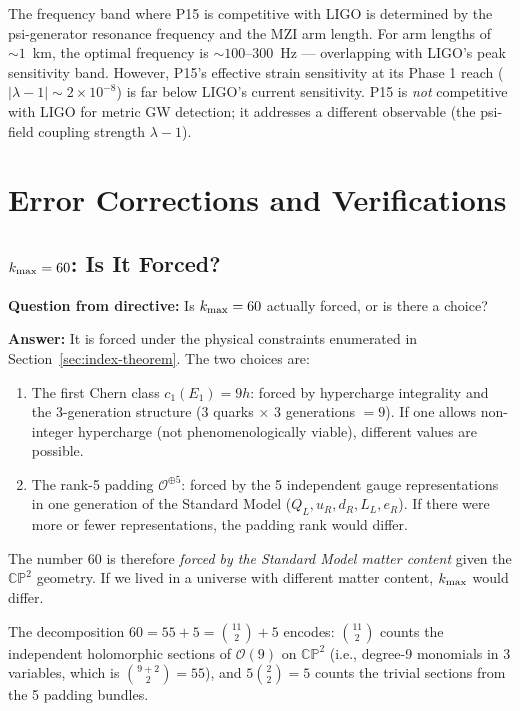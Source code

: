 \documentclass[11pt]{article}
\theoremstyle{definition}
\theoremstyle{remark}
\newcommand{\ee}[1]{\times 10^{#1}}
\begin{document}
The frequency band where P15 is competitive with LIGO is determined by
the psi-generator resonance frequency and the MZI arm length. For arm
lengths of $\sim 1$~km, the optimal frequency is $\sim 100$--300~Hz ---
overlapping with LIGO's peak sensitivity band. However, P15's effective
strain sensitivity at its Phase 1 reach ($|\lambda-1| \sim 2\ee{-8}$)
is far below LIGO's current sensitivity. P15 is \emph{not} competitive
with LIGO for metric GW detection; it addresses a different observable
(the psi-field coupling strength $\lambda - 1$).

\section{Error Corrections and Verifications}
\label{sec:errors}

\subsection{$k_{\rm max} = 60$: Is It Forced?}

\textbf{Question from directive:} Is $k_{\rm max} = 60$ actually forced,
or is there a choice?

\textbf{Answer:} It is forced under the physical constraints enumerated in
Section~\ref{sec:index-theorem}. The two choices are:
\begin{enumerate}
\item The first Chern class $c_1(E_1) = 9h$: forced by hypercharge
  integrality and the 3-generation structure (3 quarks $\times$ 3
  generations $= 9$). If one allows non-integer hypercharge (not
  phenomenologically viable), different values are possible.
\item The rank-5 padding $\mathcal{O}^{\oplus 5}$: forced by the
  5 independent gauge representations in one generation of the Standard
  Model ($Q_L, u_R, d_R, L_L, e_R$). If there were more or fewer
  representations, the padding rank would differ.
\end{enumerate}

The number 60 is therefore \emph{forced by the Standard Model matter
content} given the $\mathbb{CP}^2$ geometry. If we lived in a universe
with different matter content, $k_{\rm max}$ would differ.

The decomposition $60 = 55 + 5 = \binom{11}{2} + 5$ encodes:
$\binom{11}{2}$ counts the independent holomorphic sections of
$\mathcal{O}(9)$ on $\mathbb{CP}^2$ (i.e., degree-9 monomials in 3
variables, which is $\binom{9+2}{2} = 55$), and $5\binom{2}{2} = 5$
counts the trivial sections from the 5 padding bundles.
\end{document}
